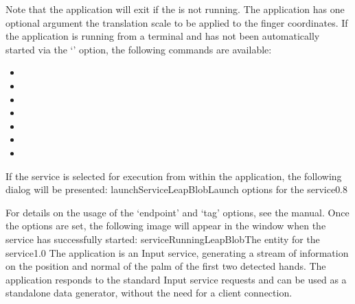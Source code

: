 Note that the application will exit if the \emph{\RS} is not running.
The application has one optional argument \longDash{} the translation scale to be applied
to the finger coordinates.
\insertAppParameters
\insertTagDescription{\LBI}
\insertInputServiceComment
\condPage{}
If the application is running from a terminal and has not been automatically started via
the `' option, the following commands are available:
\begin{itemize}
\item{}
\item\exSp{}
\item\exSp{}
\item\exSp{}
\item\exSp{}
\item\exSp{}
\item\exSp{}
\end{itemize}
\secondaryEnd
\condPage
{}
If the service is selected for execution from within the \emph{\MMMU} application, the
following dialog will be presented:
%
{launchServiceLeapBlob}{Launch options for the \emph{\LBI} service}{0.8}

For details on the usage of the `endpoint' and `tag' options, see the \emph{\MMMU} manual.
Once the options are set, the following image will appear in the \emph{\MMMU} window when
the service has successfully started:
%
{serviceRunningLeapBlob}{The \emph{\MMMU} entity for the \emph{\LBI} service}{1.0}
\secondaryEnd
\primaryEnd
{}
The  application is an Input service,
generating a stream of information on the position and normal of the palm of the first two
detected hands.
The application responds to the standard Input service requests and can be used as a
standalone data generator, without the need for a client connection.\\

